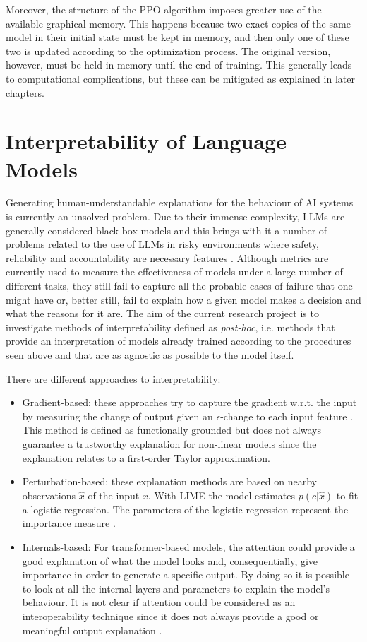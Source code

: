 Moreover, the structure of the PPO algorithm imposes greater use of the available graphical memory. This happens because two exact copies of the same model in their initial state must be kept in memory, and then only one of these two is updated according to the optimization process. The original version, however, must be held in memory until the end of training. This generally leads to computational complications, but these can be mitigated as explained in later chapters.



\section{Interpretability of Language Models}

Generating human-understandable explanations for the behaviour of AI systems is currently an unsolved problem. Due to their immense complexity, LLMs are generally considered black-box models and this brings with it a number of problems related to the use of LLMs in risky environments where safety, reliability and accountability are necessary features \citep{rudin2019stop}. Although metrics are currently used to measure the effectiveness of models under a large number of different tasks, they still fail to capture all the probable cases of failure that one might have or, better still, fail to explain how a given model makes a decision and what the reasons for it are. The aim of the current research project is to investigate methods of interpretability defined as \textit{post-hoc}, i.e. methods that provide an interpretation of models already trained according to the procedures seen above and that are as agnostic as possible to the model itself.

There are different approaches to interpretability:
\begin{itemize}
    \item Gradient-based: these approaches try to capture the gradient w.r.t. the input by measuring the change of output given an $\epsilon$-change to each input feature \citep{li-etal-2016-visualizing}. This method is defined as functionally grounded but does not always guarantee a trustworthy explanation for non-linear models since the explanation relates to a first-order Taylor approximation.
    \item Perturbation-based: these explanation methods are based on nearby observations $\hat{x}$ of the input $x$. With LIME the model estimates $p(c|\hat{x})$ to fit a logistic regression. The parameters of the logistic regression represent the importance measure \citep{ribeiro-etal-2016-trust}.
    \item Internals-based: For transformer-based models, the attention could provide a good explanation of what the model looks and, consequentially, give importance in order to generate a specific output. By doing so it is possible to look at all the internal layers and parameters to explain the model's behaviour. It is not clear if attention could be considered as an interoperability technique since it does not always provide a good or meaningful output explanation \citep{bibal-etal-2022-attention}.
\end{itemize}


